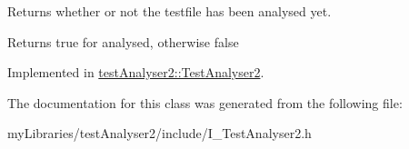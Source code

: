 Returns whether or not the testfile has been analysed yet. 

\begin{DoxyReturn}{Returns}
true for analysed, otherwise false 
\end{DoxyReturn}


Implemented in \mbox{\hyperlink{classtestAnalyser2_1_1TestAnalyser2_adc5a43d9fea5357959b1509af82a8580}{test\+Analyser2\+::\+Test\+Analyser2}}.



The documentation for this class was generated from the following file\+:\begin{DoxyCompactItemize}
\item 
my\+Libraries/test\+Analyser2/include/I\+\_\+\+Test\+Analyser2.\+h\end{DoxyCompactItemize}
